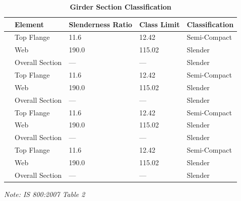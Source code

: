 \documentclass[12pt,a4paper]{report}
\numberwithin{table}{chapter}
\numberwithin{figure}{chapter}
\begin{document}
\vspace{1em}
\begin{longtable}{|C{2.5cm}|L{3cm}|C{3.5cm}|C{2.5cm}|>{\centering\arraybackslash}p{4.0cm}|}
\caption{\textbf{Girder Section Classification}}
\hline
\textbf{} & \textbf{Element} & \textbf{Slenderness Ratio} & \textbf{Class Limit} & \textbf{Classification} \\[6pt]
\hline
{} & Top Flange & 11.6 & 12.42 & Semi-Compact \\[6pt]
 & Web & 190.0 & 115.02 & Slender \\[6pt]
 & Overall Section & --- & --- & Slender \\[6pt]
\hline
{} & Top Flange & 11.6 & 12.42 & Semi-Compact \\[6pt]
 & Web & 190.0 & 115.02 & Slender \\[6pt]
 & Overall Section & --- & --- & Slender \\[6pt]
\hline
{} & Top Flange & 11.6 & 12.42 & Semi-Compact \\[6pt]
 & Web & 190.0 & 115.02 & Slender \\[6pt]
 & Overall Section & --- & --- & Slender \\[6pt]
\hline
{} & Top Flange & 11.6 & 12.42 & Semi-Compact \\[6pt]
 & Web & 190.0 & 115.02 & Slender \\[6pt]
 & Overall Section & --- & --- & Slender \\[6pt]
\hline
\end{longtable}
\noindent\textit{Note: IS 800:2007 Table 2}
\end{document}
